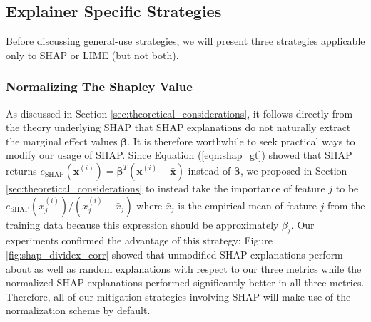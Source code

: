 \documentclass[mnsc,blindrev]{informs3}
\begin{document}
        
     


    \subsection{Explainer Specific Strategies}
        Before discussing general-use strategies, we will present three strategies applicable only to SHAP or LIME (but not both). 

            \subsubsection{Normalizing The Shapley Value}
                As discussed in Section \ref{sec:theoretical_considerations}, it follows directly from the theory underlying SHAP that SHAP explanations do not naturally extract the marginal effect values $\boldsymbol{\beta}$. It is therefore worthwhile to seek practical ways to modify our usage of SHAP. Since Equation (\ref{eqn:shap_gt}) showed that SHAP returns $e_{\text{SHAP}}(\mathbf{x}^{(i)})=\boldsymbol{\beta}^T(\mathbf{x}^{(i)} - \bar{\mathbf{x}})$ instead of $\boldsymbol{\beta}$, we proposed in Section \ref{sec:theoretical_considerations} to instead take the importance of feature $j$ to be $e_{\text{SHAP}}(x^{(i)}_j) / (x^{(i)}_j - \bar{x}_j)$ where $\bar{x}_j$ is the empirical mean of feature $j$ from the training data because this expression should be approximately $\beta_j$. Our experiments confirmed the advantage of this strategy: Figure \ref{fig:shap_dividex_corr} showed that unmodified SHAP explanations perform about as well as random explanations with respect to our three metrics while the normalized SHAP explanations performed significantly better in all three metrics. Therefore, all of our mitigation strategies involving SHAP will make use of the normalization scheme by default.

\end{document}
